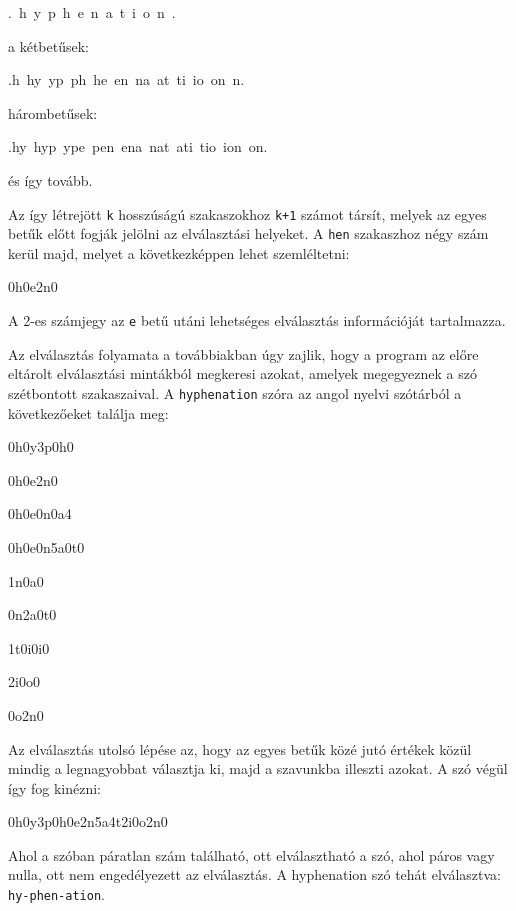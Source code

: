 \documentclass[12pt]{article}
\newenvironment{code}{%
  \begin{list}{}{\raggedright\normalfont\ttfamily}\item[]}
  {\end{list}
}
\begin{document}
\begin{code}
.~h~y~p~h~e~n~a~t~i~o~n~.
\end{code}

a kétbetűsek:

\begin{code}
.h~hy~yp~ph~he~en~na~at~ti~io~on~n.
\end{code}

hárombetűsek:

\begin{code}
.hy~hyp~ype~pen~ena~nat~ati~tio~ion~on.
\end{code}

és így tovább.

Az így létrejött \texttt{k} hosszúságú szakaszokhoz \texttt{k+1} számot
társít, melyek az egyes betűk előtt fogják jelölni az elválasztási
helyeket. A \texttt{hen} szakaszhoz négy szám kerül majd, melyet a
következképpen lehet szemléltetni:

\begin{code}
0h0e2n0
\end{code}

A 2-es számjegy az \texttt{e} betű utáni lehetséges elválasztás információját
tartalmazza.

Az elválasztás folyamata a továbbiakban úgy zajlik, hogy a program
az előre eltárolt elválasztási mintákból megkeresi azokat, amelyek
megegyeznek a szó szétbontott szakaszaival. A \texttt{hyphenation}
szóra az angol nyelvi szótárból a következőeket találja meg:

\begin{code}
0h0y3p0h0

0h0e2n0

0h0e0n0a4

0h0e0n5a0t0

1n0a0

0n2a0t0

1t0i0i0

2i0o0

0o2n0
\end{code}

Az elválasztás utolsó lépése az, hogy az egyes betűk közé jutó értékek
közül mindig a legnagyobbat választja ki, majd a szavunkba illeszti
azokat. A szó végül így fog kinézni:

\begin{code}
0h0y3p0h0e2n5a4t2i0o2n0
\end{code}

Ahol a szóban páratlan szám található, ott elválasztható a szó, ahol
páros vagy nulla, ott nem engedélyezett az elválasztás. A hyphenation
szó tehát elválasztva: \texttt{hy-phen-ation}.
\end{document}
